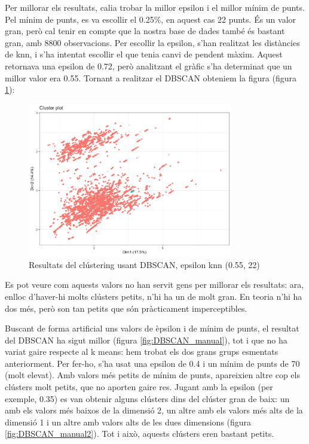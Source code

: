 Per millorar els resultats, calia trobar la millor epsilon i el millor mínim de punts. Pel mínim de punts, es va escollir el 0.25\%, en aquest cas 22 punts. És un valor gran, però cal tenir en compte que la nostra base de dades també és bastant gran, amb 8800 observacions. Per escollir la epsilon, s'han realitzat les distàncies de knn, i s'ha intentat escollir el que tenia canvi de pendent màxim. Aquest retornava una epsilon de 0.72, però analitzant el gràfic s'ha determinat que un millor valor era 0.55. Tornant a realitzar el DBSCAN obteniem la figura  (figura \ref{fig:DBSCAN_auto}):

\begin{figure}[H]
    \centering
    \includegraphics[width=0.8\textwidth]{Images/4_clustering/DBSCAN/dbscanauto.png}
    \caption{Resultats del clústering usant DBSCAN, epsilon knn (0.55, 22)}
    \label{fig:DBSCAN_auto}
\end{figure}

Es pot veure com aquests valors no han servit gens per millorar els resultats: ara, enlloc d'haver-hi molts clústers petits, n'hi ha un de molt gran. En teoria n'hi ha dos més, però son tan petits que són pràcticament imperceptibles.

Buscant de forma artificial uns valors de èpsilon i de mínim de punts, el resultat del DBSCAN ha sigut millor (figura \ref{fig:DBSCAN_manual}), tot i que no ha variat gaire respecte al k means: hem trobat els dos grans grups esmentats anteriorment. Per fer-ho, s'ha usat una epsilon de 0.4 i un mínim de punts de 70 (molt elevat). Amb valors més petits de mínim de punts, apareixien altre cop els clústers molt petits, que no aporten gaire res. Jugant amb la epsilon (per exemple, 0.35) es van obtenir alguns clústers dins del clúster gran de baix: un amb els valors més baixos de la dimensió 2, un altre amb els valors més alts de la dimensió 1 i un altre amb valors alts de les dues dimensions (figura \ref{fig:DBSCAN_manual2}). Tot i això, aquests clústers eren bastant petits.


